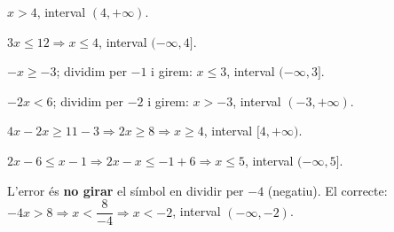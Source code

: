 \begin{solucions}
\begin{sollist}
  \item $x>4$, interval $(4,+\infty)$.
  \item $3x\le 12 \Rightarrow x\le 4$, interval $(-\infty,4]$.
  \item $-x\ge -3$; dividim per $-1$ i girem: $x\le 3$, interval $(-\infty,3]$.
  \item $-2x<6$; dividim per $-2$ i girem: $x>-3$, interval $(-3,+\infty)$.
  \item $4x-2x\ge 11-3 \Rightarrow 2x\ge 8 \Rightarrow x\ge 4$, interval $[4,+\infty)$.
  \item $2x-6\le x-1 \Rightarrow 2x-x\le -1+6 \Rightarrow x\le 5$, interval $(-\infty,5]$.
  \item L'error és \textbf{no girar} el símbol en dividir per $-4$ (negatiu). El
        correcte: $-4x>8 \Rightarrow x<\dfrac{8}{-4} \Rightarrow x<-2$, interval
        $(-\infty,-2)$.
\end{sollist}
\end{solucions}
